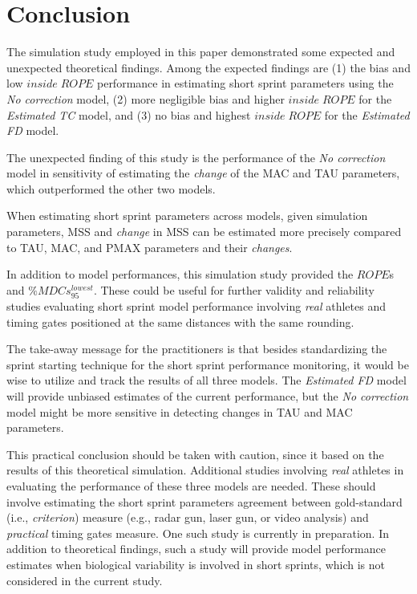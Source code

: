 \documentclass[fleqn,10pt]{wlpeerj} %
\begin{document}
\hypertarget{conclusion}{%
\section{Conclusion}\label{conclusion}}

The simulation study employed in this paper demonstrated some expected and unexpected theoretical findings. Among the expected findings are (1) the bias and low \(inside \; ROPE\) performance in estimating short sprint parameters using the \emph{No correction} model, (2) more negligible bias and higher \(inside \; ROPE\) for the \emph{Estimated TC} model, and (3) no bias and highest \(inside \; ROPE\) for the \emph{Estimated FD} model.

The unexpected finding of this study is the performance of the \emph{No correction} model in sensitivity of estimating the \emph{change} of the MAC and TAU parameters, which outperformed the other two models.

When estimating short sprint parameters across models, given simulation parameters, MSS and \emph{change} in MSS can be estimated more precisely compared to TAU, MAC, and PMAX parameters and their \emph{changes}.

In addition to model performances, this simulation study provided the \(ROPE\)s and \(\%MDCs_{95}^{lowest}\). These could be useful for further validity and reliability studies evaluating short sprint model performance involving \emph{real} athletes and timing gates positioned at the same distances with the same rounding.

The take-away message for the practitioners is that besides standardizing the sprint starting technique for the short sprint performance monitoring, it would be wise to utilize and track the results of all three models. The \emph{Estimated FD} model will provide unbiased estimates of the current performance, but the \emph{No correction} model might be more sensitive in detecting changes in TAU and MAC parameters.

This practical conclusion should be taken with caution, since it based on the results of this theoretical simulation. Additional studies involving \emph{real} athletes in evaluating the performance of these three models are needed. These should involve estimating the short sprint parameters agreement between gold-standard (i.e., \emph{criterion}) measure (e.g., radar gun, laser gun, or video analysis) and \emph{practical} timing gates measure. One such study is currently in preparation. In addition to theoretical findings, such a study will provide model performance estimates when biological variability is involved in short sprints, which is not considered in the current study.
\end{document}
